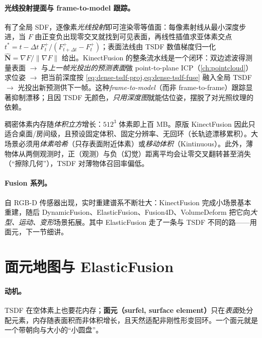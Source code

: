 \paragraph{光线投射提面与 frame-to-model 跟踪。}
有了全局 SDF，逐像素\emph{光线投射}即可渲染零等值面：每像素射线从最小深度步进，当 $F$ 由正变负出现零交叉就找到可见表面，再线性插值求亚体素交点 $t^*=t-\Delta t\,F_t^+/(F_{t+\Delta t}^+-F_t^+)$；表面法线由 TSDF 数值梯度归一化 $\hat{\mathbf{N}}=\nabla F/\|\nabla F\|$ 给出。KinectFusion 的整条流水线是一个闭环：双边滤波得测量表面 $\to$ 与\emph{上一帧光投出的预测表面}做 point-to-plane ICP（\cref{ch:pointcloud}）求位姿 $\to$ 把当前深度按 \cref{eq:dense-tsdf-proj,eq:dense-tsdf-fuse} 融入全局 TSDF $\to$ 光投出新预测供下一帧。这种\emph{frame-to-model}（而非 frame-to-frame）跟踪显著抑制漂移；且因 TSDF 无颜色，\emph{只用深度图}就能估位姿，摆脱了对光照纹理的依赖。

\begin{pitfall}
稠密体素内存随\emph{体积立方}增长：$512^3$ 体素即上百 MB。原版 KinectFusion 因此只适合桌面/房间级，且预设固定体积、固定分辨率、无回环（长轨迹漂移累积）。大场景必须用\emph{体素哈希}（只存表面附近体素）或\emph{移动体积}（Kintinuous）。此外，薄物体从两侧观测时，正（观测）与负（幻觉）距离平均会让零交叉翻转甚至消失（“擦除几何”），TSDF 对薄物体召回率偏低。
\end{pitfall}

\paragraph{Fusion 系列。}
自 RGB-D 传感器出现，实时重建谱系不断壮大：KinectFusion 完成小场景基本重建，随后 DynamicFusion、ElasticFusion、Fusion4D、VolumeDeform 把它向\emph{大型、运动、变形}场景拓展。其中 ElasticFusion 走了一条与 TSDF 不同的路——用面元，下一节细讲。

\section{面元地图与 ElasticFusion}
\label{sec:dense-surfel}

\paragraph{动机。}
TSDF 在空体素上也要花内存；\textbf{面元（surfel, surface element）}只在\emph{表面}处分配元素，内存随表面积而非体积增长，且天然适配非刚性形变回环\cite{whelan2015elasticfusion}。一个面元就是一个带朝向与大小的“小圆盘”。

